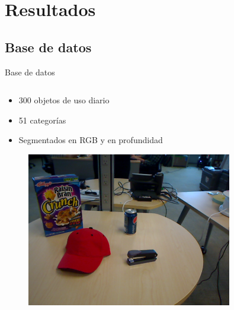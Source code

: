 \documentclass[]{beamer}
\begin{document}
\section{Resultados}
\subsection{Base de datos}
\begin{frame}{Base de datos}



    \begin{columns}[t]
        \begin{column}{5cm}
            \begin{itemize}
                \item 300 objetos de uso diario
                \item 51 categorías
                \item Segmentados en RGB y en profundidad
            \end{itemize}

            \begin{figure}
                \includegraphics[width=0.8\textwidth]{img/base/scene.png}
            \end{figure}


\end{column}
\end{columns}
\end{frame}
\end{document}
